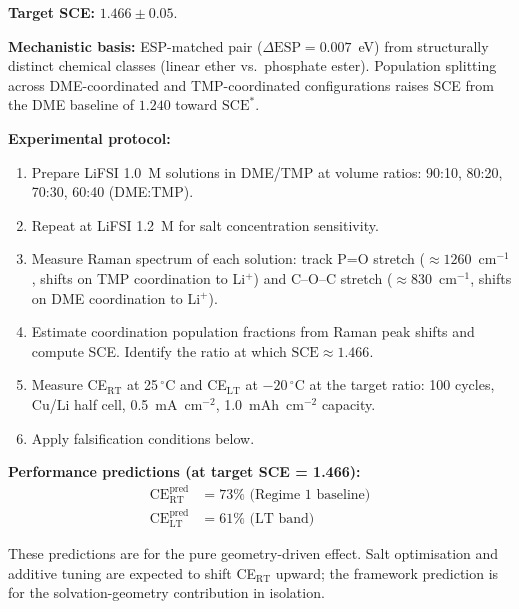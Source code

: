 \documentclass[11pt]{article}
\theoremstyle{plain}
\theoremstyle{definition}
\theoremstyle{remark}
\begin{document}
\textbf{Target SCE:} $1.466 \pm 0.05$.

\textbf{Mechanistic basis:} ESP-matched pair ($\Delta\mathrm{ESP} = 0.007$~eV)
from structurally distinct chemical classes (linear ether vs.\ phosphate
ester).  Population splitting across DME-coordinated and TMP-coordinated
configurations raises SCE from the DME baseline of $1.240$ toward
$\mathrm{SCE}^{*}$.

\textbf{Experimental protocol:}
\begin{enumerate}[leftmargin=2em]
  \item Prepare LiFSI 1.0~M solutions in DME/TMP at volume ratios:
        90:10, 80:20, 70:30, 60:40 (DME:TMP).
  \item Repeat at LiFSI 1.2~M for salt concentration sensitivity.
  \item Measure Raman spectrum of each solution: track P=O stretch
        ($\approx 1260$~cm$^{-1}$, shifts on TMP coordination to Li$^+$)
        and C--O--C stretch ($\approx 830$~cm$^{-1}$, shifts on DME
        coordination to Li$^+$).
  \item Estimate coordination population fractions from Raman peak shifts
        and compute SCE.  Identify the ratio at which $\mathrm{SCE} \approx
        1.466$.
  \item Measure CE$_{\mathrm{RT}}$ at 25\,$^\circ$C and CE$_{\mathrm{LT}}$
        at $-20\,^\circ$C at the target ratio: 100 cycles, Cu/Li half cell,
        0.5~mA~cm$^{-2}$, 1.0~mAh~cm$^{-2}$ capacity.
  \item Apply falsification conditions below.
\end{enumerate}

\textbf{Performance predictions (at target SCE = 1.466):}
\begin{align*}
  \mathrm{CE}_{\mathrm{RT}}^{\mathrm{pred}} &= 73\% \text{ (Regime~1 baseline)}\\
  \mathrm{CE}_{\mathrm{LT}}^{\mathrm{pred}} &= 61\% \text{ (LT band)}
\end{align*}

\noindent These predictions are for the pure geometry-driven effect.
Salt optimisation and additive tuning are expected to shift CE$_\mathrm{RT}$
upward; the framework prediction is for the solvation-geometry contribution
in isolation.
\end{document}
